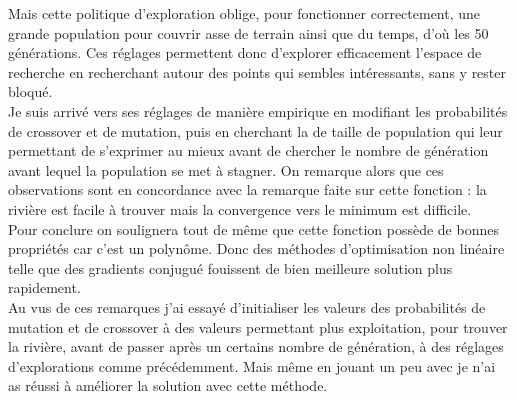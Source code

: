 \documentclass[12pt,a4paper]{article}
\begin{document}
Mais cette politique d'exploration oblige, pour fonctionner correctement, une grande population pour couvrir asse de terrain ainsi que du temps, d'où les 50 générations. Ces réglages permettent donc d'explorer efficacement l'espace de recherche en recherchant autour des points qui sembles intéressants, sans y rester bloqué.\\

Je suis arrivé vers ses réglages de manière empirique en modifiant les probabilités de crossover et de mutation, puis en cherchant la de taille de population qui leur permettant de s'exprimer au mieux avant de chercher le nombre de génération avant lequel la population se met à stagner.
On remarque alors que ces observations sont en concordance avec la remarque faite sur cette fonction : la rivière est facile à trouver mais la convergence vers le minimum est difficile.\\

Pour conclure on soulignera tout de même que cette fonction possède de bonnes propriétés car c'est un polynôme. Donc des méthodes d'optimisation non linéaire telle que des gradients conjugué fouissent de bien meilleure solution plus rapidement.\\

Au vus de ces remarques j'ai essayé d'initialiser les valeurs des probabilités de mutation et de crossover à des valeurs permettant plus exploitation, pour trouver la rivière, avant de passer après un certains nombre de génération, à des réglages d'explorations comme précédemment. Mais même en jouant un peu avec je n'ai as réussi à améliorer la solution avec cette méthode. 
\end{document}
